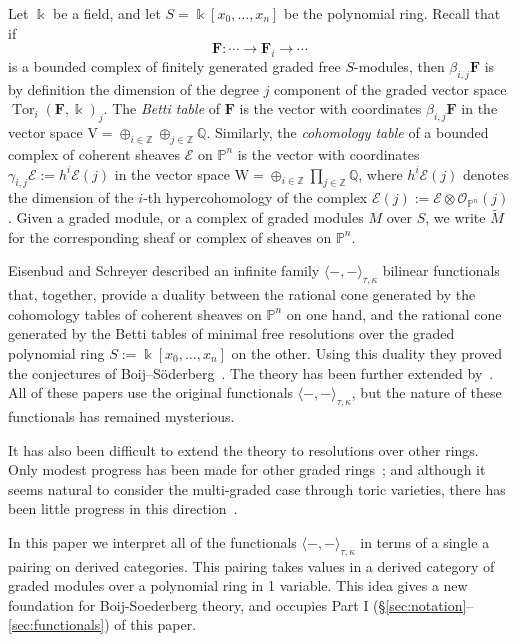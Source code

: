 \documentclass[12pt]{amsart}
\theoremstyle{definition}
\theoremstyle{remark}
\newcommand{\Tor}{\operatorname{Tor}}
\newcommand{\kk}{\Bbbk}
\newcommand{\PP}{\mathbb{P}}
\newcommand{\ZZ}{\mathbb{Z}}
\newcommand{\QQ}{\mathbb{Q}}
\newcommand{\VV}{\mathrm{V}}
\newcommand{\WW}{\mathrm{W}}
\newcommand{\cO}{\mathcal{O}}
\newcommand{\cE}{\mathcal{E}}
\newcommand{\FF}{\mathbf{F}}
\begin{document}
Let $\kk$ be a field, and let $S=\kk[x_0, \dots, x_n]$ be the polynomial ring. Recall that if 
$$
\FF: \cdots \to \FF_{i}\to \cdots
$$
is a bounded complex of finitely generated graded free $S$-modules, then $\beta_{i,j}\FF$ is by definition the dimension of the degree $j$ component of the graded vector space $\Tor_i(\FF,\kk)_j$.  The \emph{Betti table} of $\FF$ is the vector with coordinates $\beta_{i,j}\FF$ in the vector space $\VV = \oplus_{i\in \ZZ} \oplus_{j\in \ZZ}\QQ$. Similarly, the \emph{cohomology table} of a bounded complex of coherent sheaves $\cE$ on $\PP^{n}$ is the vector with coordinates $\gamma_{i,j}\cE := h^{i}\cE(j)$ in the vector space $\WW = \oplus_{i\in \ZZ}\prod_{j\in \ZZ}\QQ$, where $h^{i}\cE(j)$ denotes the dimension of the $i$-th hypercohomology of the complex $\cE(j) := \cE \otimes \cO_{\PP^{n}}(j)$. 
Given a graded module, or a complex of graded modules $M$ over $S$, we write $\widetilde M$ for the corresponding sheaf or complex of sheaves on $\PP^{n}$. 


Eisenbud and Schreyer \cite{eis-schrey1} described an infinite family $\langle -,-\rangle_{\tau,\kappa}$ bilinear functionals that, together, provide a duality between the rational cone generated by the cohomology tables of coherent sheaves on $\PP^n$ on one hand,  and the rational cone generated by the Betti tables of minimal free resolutions over the graded polynomial ring $S:=\kk[x_0, \dots, x_n]$ on the other. Using this duality they proved the conjectures of Boij--S\"oderberg~\cite{boij-sod1}. The theory has been further extended by~\cite{boij-sod2,eis-schrey2}. All of these papers use the original functionals $\langle -,-\rangle_{\tau,\kappa}$, but the nature of these functionals has remained mysterious. 

It has also been difficult to extend the theory to resolutions over other rings.  Only modest progress has been made for other graded rings~\cites{beks-local}; and although it seems natural to consider the multi-graded case through toric varieties, there has been little progress in this direction~\cite{boij-floystad,floystad-multigraded}.

In this paper we interpret all of the functionals $\langle-,-\rangle_{\tau,\kappa}$ in terms of a single a pairing on derived categories. This pairing takes values in a derived category of graded modules over a polynomial ring in 1 variable.  This idea gives a new foundation for Boij-Soederberg theory, and occupies Part I (\S\ref{sec:notation}--\ref{sec:functionals}) of this paper. 
\end{document}
